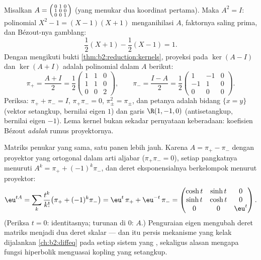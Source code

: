\begin{example}\label{ex:b2:reduction:projectorswork}
Misalkan $A = \begin{psmallmatrix}0 & 1 & 0\\ 1 & 0 & 0\\ 0 & 0 &
1\end{psmallmatrix}$ (yang menukar dua koordinat pertama). Maka $A^2
= I$: polinomial $X^2 - 1 = (X - 1)(X + 1)$ menganihilasi $A$,
faktornya saling prima, dan Bézout-nya gamblang:
\[
\frac{1}{2}(X + 1) - \frac12(X - 1) = 1 .
\]
Dengan mengikuti bukti \cref{thm:b2:reduction:kernels}, proyeksi
pada $\ker(A - I)$ dan $\ker(A + I)$ adalah polinomial
dalam $A$ berikut:
\[
\pi_+ = \frac{A + I}{2} = \frac12\begin{pmatrix}
1 & 1 & 0\\ 1 & 1 & 0\\ 0 & 0 & 2\end{pmatrix},
\qquad
\pi_- = \frac{I - A}{2} = \frac12\begin{pmatrix}
1 & -1 & 0\\ -1 & 1 & 0\\ 0 & 0 & 0\end{pmatrix}.
\]
Periksa: $\pi_+ + \pi_- = I$, $\pi_+\pi_- = 0$, $\pi_\pm^2 =
\pi_\pm$, dan petanya adalah bidang $\{x = y\}$ (vektor setangkup,
bernilai eigen $1$) dan garis $\R(1, -1, 0)$
(antisetangkup, bernilai eigen $-1$). Lema kernel bukan sekadar
pernyataan keberadaan: koefisien Bézout \emph{adalah} rumus
proyektornya.
\end{example}

\begin{example}\label{ex:b2:reduction:expprojectors}
Matriks penukar yang sama, satu panen lebih jauh. Karena $A = \pi_+ -
\pi_-$ dengan proyektor yang ortogonal dalam arti aljabar
($\pi_+\pi_- = 0$), setiap pangkatnya menuruti $A^k = \pi_+ +
(-1)^k\pi_-$, dan deret eksponensialnya berkelompok menurut proyektor:
\[
\eu^{tA} = \sum_k \frac{t^k}{k!}\bigl(\pi_+ +
(-1)^k\pi_-\bigr)
= \eu^{t}\,\pi_+ + \eu^{-t}\,\pi_- =
\begin{pmatrix}
\cosh t & \sinh t & 0\\
\sinh t & \cosh t & 0\\
0 & 0 & \eu^{t}
\end{pmatrix}.
\]
(Periksa $t = 0$: identitasnya; turunan di $0$: $A$.) Penguraian
eigen mengubah deret matriks menjadi dua deret skalar --- dan itu persis
mekanisme yang kelak dijalankan \cref{ch:b2:diffeq} pada setiap sistem
yang , sekaligus alasan mengapa fungsi hiperbolik
menguasai kopling yang setangkup.
\end{example}

